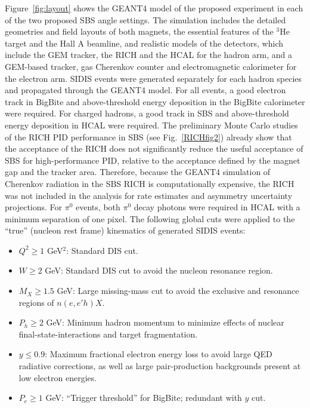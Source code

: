 Figure~\ref{fig:layout} shows the GEANT4 model of the proposed experiment in each of the two proposed SBS angle settings. The simulation includes the detailed geometries and field layouts of both magnets, the essential features of the $^3$He target and the Hall A beamline, and realistic models of the detectors, which include the GEM tracker, the RICH and the HCAL for the hadron arm, and a GEM-based tracker, gas Cherenkov counter and electromagnetic calorimeter for the electron arm. SIDIS events were generated separately for each hadron species and propagated through the GEANT4 model. For all events, a good electron track in BigBite and above-threshold energy deposition in the BigBite calorimeter were required. For charged hadrons, a good track in SBS and above-threshold energy deposition in HCAL were required. The preliminary Monte Carlo studies of the RICH PID performance in SBS (see Fig.~\ref{RICHfig2}) already show that the acceptance of the RICH does not significantly reduce the useful acceptance of SBS for high-performance PID, relative to the acceptance defined by the magnet gap and the tracker area. Therefore, because the GEANT4 simulation of Cherenkov radiation in the SBS RICH is computationally expensive, the RICH was not included in the analysis for rate estimates and asymmetry uncertainty projections.  For $\pi^0$ events, both $\pi^0$ decay photons were required in HCAL with a minimum separation of one pixel. The following global cuts were applied to the ``true'' (nucleon rest frame) kinematics of generated SIDIS events:
\begin{itemize}
\item $Q^2 \ge 1$ GeV$^2$: Standard DIS cut. 
\item $W \ge 2$ GeV: Standard DIS cut to avoid the nucleon resonance region.
\item $M_X \ge 1.5$ GeV: Large missing-mass cut to avoid the exclusive and resonance regions of $n(e,e'h)X$.
\item $P_h \ge 2$ GeV: Minimum hadron momentum to minimize effects of nuclear final-state-interactions and target fragmentation.
\item $y \le 0.9$: Maximum fractional electron energy loss to avoid large QED radiative corrections, as well as large pair-production backgrounds present at low electron energies.
\item $P_e \ge 1$ GeV: ``Trigger threshold'' for BigBite; redundant with $y$ cut. 
\end{itemize}
